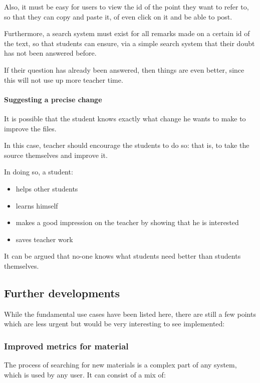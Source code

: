 \documentclass[12pt]{article}
\begin{document}
Also, it must be easy for users to view the id of the point they want to refer to, so that they can copy and paste it, of even click on it and be able to post.
  
Furthermore, a search system must exist for all remarks made on a certain id of the text, so that students can ensure, via a simple search system that their doubt has not been answered before.
  
If their question has already been answered, then things are even better, since this will not use up more teacher time. 
  
\paragraph{Suggesting a precise change} \label{suggesting-a-precise-change}

It is possible that the student knows exactly what change he wants to make to improve the files.

In this case, teacher should encourage the students to do so: that is, to take the source themselves and improve it.

In doing so, a student:

\begin{itemize}
  \item helps other students
  \item learns himself
  \item makes a good impression on the teacher by showing that he is interested
  \item saves teacher work
\end{itemize}

It can be argued that no-one knows what students need better than students themselves.

\subsection{Further developments} \label{further-developments}

While the fundamental use cases have been listed here, there are still a few points which are less urgent but would be very interesting to see implemented:

\subsubsection{Improved metrics for material}

The process of searching for new materials is a complex part of any system, which is used by any user. It can consist of a mix of:
\end{document}
